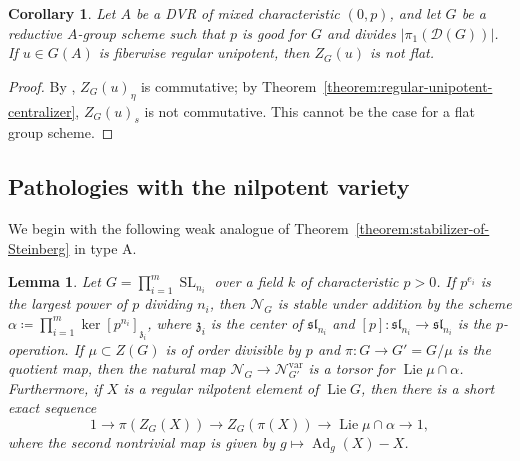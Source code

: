 \documentclass[11pt,reqno]{amsart}
\newtheorem{lemma}[theorem]{Lemma}
\newtheorem{cor}[theorem]{Corollary}
\theoremstyle{definition}
\renewcommand{\rm}{\mathrm}
\newcommand{\sD}{{\mathscr D}}
\newcommand{\sN}{{\mathscr N}}
\newcommand{\fz}{\mathfrak{z}}
\DeclareMathOperator{\Ad}{Ad}
\DeclareMathOperator{\Lie}{Lie}
\DeclareMathOperator{\SL}{SL}
\begin{document}
\begin{cor}\label{cor:non-flat-unip}
Let $A$ be a DVR of mixed characteristic $(0, p)$, and let $G$ be a reductive $A$-group scheme such that $p$ is good for $G$ and divides $|\pi_1(\sD(G))|$. If $u \in G(A)$ is fiberwise regular unipotent, then $Z_G(u)$ is not flat.
\end{cor}

\begin{proof}
By \cite[Corollary 3.11]{Integral-Springer}, $Z_G(u)_\eta$ is commutative; by Theorem~\ref{theorem:regular-unipotent-centralizer}, $Z_G(u)_s$ is not commutative. This cannot be the case for a flat group scheme.
\end{proof}










\subsection{Pathologies with the nilpotent variety}\label{ss:nilp}

We begin with the following weak analogue of Theorem~\ref{theorem:stabilizer-of-Steinberg} in type $\rm{A}$.

\begin{lemma}\label{lemma:nilpotent-variety-stable}
Let $G = \prod_{i=1}^m\SL_{n_i}$ over a field $k$ of characteristic $p > 0$. If $p^{e_i}$ is the largest power of $p$ dividing $n_i$, then $\sN_G$ is stable under addition by the scheme $\alpha\coloneqq \prod_{i=1}^m\ker [p^{n_i}]_{\fz_i}$, where $\fz_i$ is the center of $\mathfrak{sl}_{n_i}$ and $[p]: \mathfrak{sl}_{n_i} \to \mathfrak{sl}_{n_i}$ is the $p$-operation. If $\mu \subset Z(G)$ is of order divisible by $p$ and $\pi\colon G \to G' = G/\mu$ is the quotient map, then the natural map $\sN_G \to \sN_{G'}^{\rm{var}}$ is a torsor for $\Lie \mu \cap \alpha$. Furthermore, if $X$ is a regular nilpotent element of $\Lie G$, then there is a short exact sequence
\[
1 \to \pi(Z_G(X)) \to Z_G(\pi(X)) \to \Lie \mu \cap \alpha \to 1,
\]
where the second nontrivial map is given by $g \mapsto \Ad_g(X) - X$.
\end{lemma}
\end{document}
